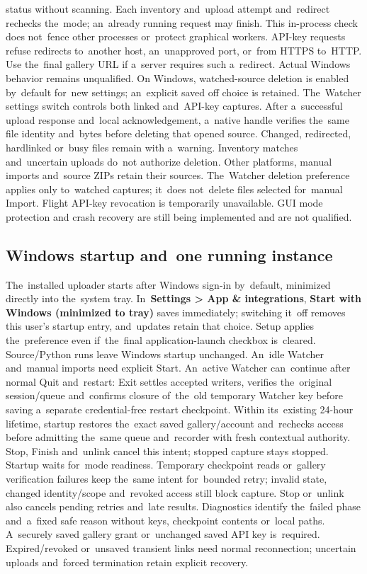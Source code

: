 \documentclass[11pt,a4paper]{article}
\newcommand{\ui}[1]{\textbf{#1}}
\begin{document}
status without scanning. Each inventory and~upload attempt and~redirect
rechecks the~mode; an~already running request may finish. This in-process
check does not~fence other processes or~protect graphical workers.
API-key requests refuse redirects to~another host, an~unapproved port, or~from
HTTPS to~HTTP. Use the~final gallery URL if a~server requires such a~redirect.
Actual Windows behavior remains unqualified.
On Windows, watched-source deletion is enabled by~default for~new settings;
an~explicit saved off choice is retained. The~Watcher settings switch controls
both linked and~API-key captures. After a~successful upload response and~local
acknowledgement, a~native handle verifies the~same file identity and~bytes
before deleting that opened source. Changed, redirected, hardlinked or~busy
files remain with a~warning. Inventory matches and~uncertain uploads do~not
authorize deletion. Other platforms, manual imports and~source ZIPs retain
their sources. The~Watcher deletion preference applies only to~watched
captures; it~does not~delete files selected for~manual Import. Flight
API-key revocation is temporarily unavailable. GUI mode protection and crash
recovery are still being implemented and are not qualified.

\subsection{Windows startup and~one running instance}

The~installed uploader starts after Windows sign-in by~default, minimized
directly into the~system tray. In~\ui{Settings > App \& integrations},
\ui{Start with Windows (minimized to tray)} saves immediately; switching it~off
removes this user's startup entry, and~updates retain that choice. Setup applies
the~preference even if~the~final application-launch checkbox is~cleared.
Source/Python runs leave Windows startup unchanged. An~idle Watcher and~manual
imports need explicit Start. An~active Watcher can~continue after normal Quit
and~restart: Exit settles accepted writers, verifies the~original session/queue
and~confirms closure of~the~old temporary Watcher key before saving a~separate
credential-free restart checkpoint. Within its~existing 24-hour lifetime,
startup restores the~exact saved gallery/account and~rechecks access before
admitting the~same queue and~recorder with fresh contextual authority.
Stop, Finish and~unlink cancel this intent; stopped capture stays stopped.
Startup waits for~mode readiness. Temporary checkpoint reads or~gallery
verification failures keep the~same intent for~bounded retry; invalid state,
changed identity/scope and~revoked access still block capture. Stop or~unlink
also cancels pending retries and~late results. Diagnostics identify the~failed
phase and~a~fixed safe reason without keys, checkpoint contents or~local paths.
A~securely saved gallery grant or~unchanged saved API key is~required.
Expired/revoked or~unsaved transient links need normal reconnection;
uncertain uploads and~forced termination retain explicit recovery.
\end{document}
